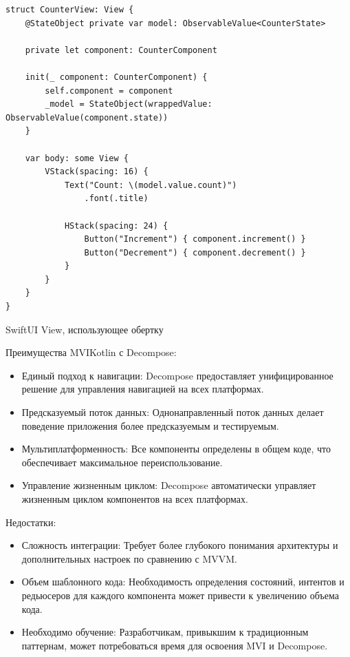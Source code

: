 \documentclass[14pt, russian]{scrartcl}
\begin{document}
\begin{enumerate}
    \begin{listing}[H]
    \begin{verbatim}
struct CounterView: View {
    @StateObject private var model: ObservableValue<CounterState>

    private let component: CounterComponent

    init(_ component: CounterComponent) {
        self.component = component
        _model = StateObject(wrappedValue: ObservableValue(component.state))
    }

    var body: some View {
        VStack(spacing: 16) {
            Text("Count: \(model.value.count)")
                .font(.title)

            HStack(spacing: 24) {
                Button("Increment") { component.increment() }
                Button("Decrement") { component.decrement() }
            }
        }
    }
}
    \end{verbatim}
    \caption{SwiftUI View, использующее обертку}
    \label{lst:swift_mvi_view}
    \end{listing}
\end{enumerate}

Преимущества MVIKotlin с Decompose:
\begin{itemize}
    \item Единый подход к навигации: Decompose предоставляет унифицированное решение для управления навигацией на всех платформах.
    \item Предсказуемый поток данных: Однонаправленный поток данных делает поведение приложения более предсказуемым и тестируемым.
    \item Мультиплатформенность: Все компоненты определены в общем коде, что обеспечивает максимальное переиспользование.
    \item Управление жизненным циклом: Decompose автоматически управляет жизненным циклом компонентов на всех платформах.
\end{itemize}

Недостатки:
\begin{itemize}
    \item Сложность интеграции: Требует более глубокого понимания архитектуры и дополнительных настроек по сравнению с MVVM.
    \item Объем шаблонного кода: Необходимость определения состояний, интентов и редьюсеров для каждого компонента может привести к увеличению объема кода.
    \item Необходимо обучение: Разработчикам, привыкшим к традиционным паттернам, может потребоваться время для освоения MVI и Decompose.
\end{itemize}
\end{document}
